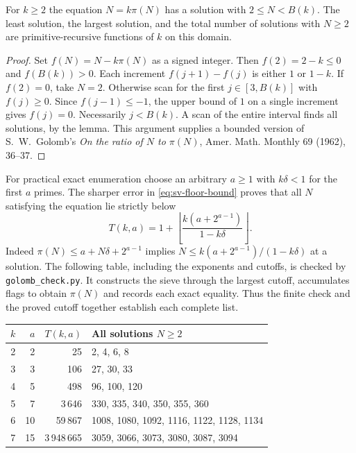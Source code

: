 \begin{proposition}
For $k\ge2$ the equation $N=k\pi(N)$ has a solution with $2\le N<B(k)$. The least solution, the largest solution, and the total number of solutions with $N\ge2$ are primitive-recursive functions of $k$ on this domain.
\end{proposition}
\begin{proof}
Set $f(N)=N-k\pi(N)$ as a signed integer. Then $f(2)=2-k\le0$ and $f(B(k))>0$. Each increment $f(j+1)-f(j)$ is either $1$ or $1-k$. If $f(2)=0$, take $N=2$. Otherwise scan for the first $j\in[3,B(k)]$ with $f(j)\ge0$. Since $f(j-1)\le-1$, the upper bound of $1$ on a single increment gives $f(j)=0$. Necessarily $j<B(k)$. A scan of the entire interval finds all solutions, by the lemma. This argument supplies a bounded version of S.~W.~Golomb's \emph{On the ratio of $N$ to $\pi(N)$}, Amer. Math. Monthly 69 (1962), 36--37.
\end{proof}

For practical exact enumeration choose an arbitrary $a\ge1$ with $k\delta<1$ for the first $a$ primes. The sharper error in \eqref{eq:sv-floor-bound} proves that all $N$ satisfying the equation lie strictly below
\[
 T(k,a)=1+\left\lfloor\frac{k(a+2^{a-1})}{1-k\delta}\right\rfloor .
\]
Indeed $\pi(N)\le a+N\delta+2^{a-1}$ implies $N\le k(a+2^{a-1})/(1-k\delta)$ at a solution. The following table, including the exponents and cutoffs, is checked by \texttt{golomb\_check.py}. It constructs the sieve through the largest cutoff, accumulates flags to obtain $\pi(N)$ and records each exact equality. Thus the finite check and the proved cutoff together establish each complete list.
\begin{center}
\small
\begin{tabular}{r r r l}
$k$&$a$&$T(k,a)$&All solutions $N\ge2$\\ \hline
2&2&25&2, 4, 6, 8\\
3&3&106&27, 30, 33\\
4&5&498&96, 100, 120\\
5&7&3\,646&330, 335, 340, 350, 355, 360\\
6&10&59\,867&1008, 1080, 1092, 1116, 1122, 1128, 1134\\
7&15&3\,948\,665&3059, 3066, 3073, 3080, 3087, 3094
\end{tabular}
\end{center}
